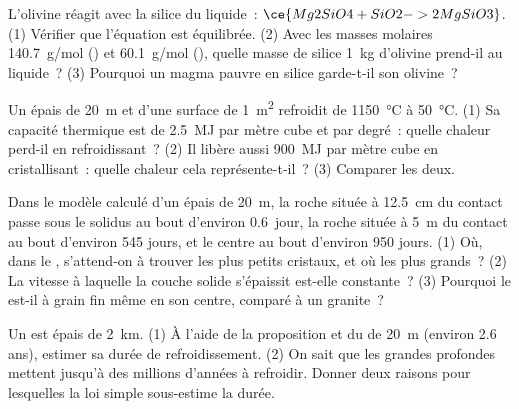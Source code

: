 \begin{exercise}[$\star\star$]\label{exo:g11:igneous-rocks:10}
L'olivine réagit avec la silice du liquide~: $\ce{Mg2SiO4 + SiO2 -> 2
MgSiO3}$. (1) Vérifier que l'équation est équilibrée. (2) Avec les masses
molaires \qty{140.7}{g/mol} () et \qty{60.1}{g/mol}
(), quelle masse de silice \qty{1}{kg} d'olivine prend-il au
liquide~? (3) Pourquoi un magma pauvre en silice garde-t-il son olivine~?
\end{exercise}

\begin{exercise}[$\star\star$]\label{exo:g11:igneous-rocks:11}
Un  épais de \qty{20}{m} et d'une surface de \qty{1}{m^2} refroidit de
\qty{1150}{\degreeCelsius} à \qty{50}{\degreeCelsius}. (1) Sa capacité
thermique est de \qty{2.5}{MJ} par mètre cube et par degré~: quelle chaleur
perd-il en refroidissant~? (2) Il libère aussi \qty{900}{MJ} par mètre cube
en cristallisant~: quelle chaleur cela représente-t-il~? (3) Comparer les
deux.
\end{exercise}

\begin{exercise}[$\star\star\star$]\label{exo:g11:igneous-rocks:12}
Dans le modèle calculé d'un  épais de \qty{20}{m}, la roche située à
\qty{12.5}{cm} du contact passe sous le solidus au bout d'environ
\num{0.6}~jour, la roche située à \qty{5}{m} du contact au bout d'environ
545 jours, et le centre au bout d'environ 950 jours. (1) Où, dans le ,
s'attend-on à trouver les plus petits cristaux, et où les plus grands~?
(2) La vitesse à laquelle la couche solide s'épaissit est-elle constante~?
(3) Pourquoi le  est-il à grain fin même en son centre, comparé à un
granite~?
\end{exercise}

\begin{exercise}[$\star\star\star$]\label{exo:g11:igneous-rocks:13}
Un  est épais de \qty{2}{km}. (1) À l'aide de la proposition et du
 de \qty{20}{m} (environ 2.6 ans), estimer sa durée de refroidissement.
(2) On sait que les grandes  profondes mettent jusqu'à des
millions d'années à refroidir. Donner deux raisons pour lesquelles la loi
simple sous-estime la durée.
\end{exercise}


